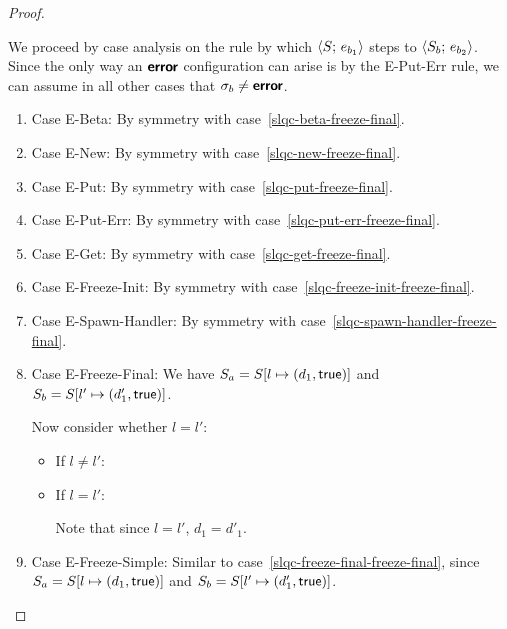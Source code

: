 \begin{proof}
\begin{enumerate}
    We proceed by case analysis on the rule by which
    $\langle S;\, e_{b_1} \rangle$ steps to $\langle S_b;\, e_{b_2} \rangle$.  Since the
    only way an $\textbf{\textsf{error}}$ configuration can arise is by the {\sc
      E-Put-Err} rule, we can assume in all other cases that $\sigma_b
    \neq \textbf{\textsf{error}}$.
    \begin{enumerate}
    \item \label{slqc-freeze-final-beta}Case {\sc E-Beta}: By symmetry with case~\ref{slqc-beta-freeze-final}.
    \item \label{slqc-freeze-final-new}Case {\sc E-New}: By symmetry with case~\ref{slqc-new-freeze-final}.
    \item \label{slqc-freeze-final-put}Case {\sc E-Put}: By symmetry with case~\ref{slqc-put-freeze-final}.
    \item \label{slqc-freeze-final-put-err}Case {\sc E-Put-Err}: By symmetry with case~\ref{slqc-put-err-freeze-final}.
    \item \label{slqc-freeze-final-get}Case {\sc E-Get}: By symmetry with case~\ref{slqc-get-freeze-final}.
    \item \label{slqc-freeze-final-freeze-init}Case {\sc E-Freeze-Init}: By symmetry with case~\ref{slqc-freeze-init-freeze-final}.
    \item \label{slqc-freeze-final-spawn-handler}Case {\sc E-Spawn-Handler}: By symmetry with case~\ref{slqc-spawn-handler-freeze-final}.
    \item \label{slqc-freeze-final-freeze-final}Case {\sc
      E-Freeze-Final}: We have $S_a = S[l \mapsto (d_1, \textsf{true})]$
      and $S_b = S[l' \mapsto (d'_1, \textsf{true})]$.

      Now consider whether $l = l'$:
      \begin{itemize}
        \item If $l \neq l'$:

          \TODO{}

        \item If $l = l'$:

          Note that since $l = l'$, $d_1 = d'_1$.

          \TODO{}
      \end{itemize}


    \item \label{slqc-freeze-final-freeze-simple}Case {\sc
      E-Freeze-Simple}: Similar to
      case~\ref{slqc-freeze-final-freeze-final}, since $S_a =
      S[l \mapsto (d_1, \textsf{true})]$ and $S_b =
      S[l' \mapsto (d'_1, \textsf{true})]$.
    \end{enumerate}


\end{enumerate}
\end{proof}
